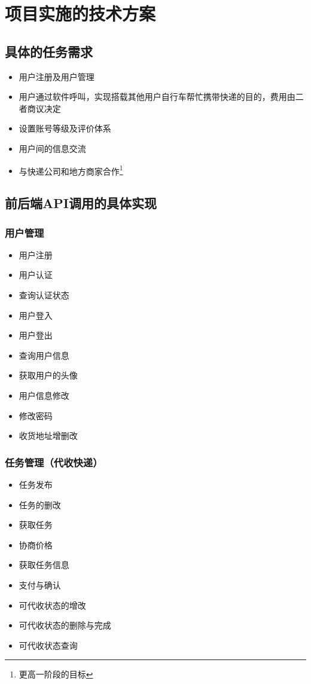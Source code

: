 \documentclass[UTF8]{dingo}
\begin{document}
  \section{项目实施的技术方案}
    \subsection{具体的任务需求}
      \begin{itemize}
        \item 用户注册及用户管理
        \item 用户通过软件呼叫，实现搭载其他用户自行车帮忙携带快递的目的，费用由二者商议决定
        \item 设置账号等级及评价体系
        \item 用户间的信息交流
        \item 与快递公司和地方商家合作\footnote{更高一阶段的目标}
      \end{itemize}
    \subsection{前后端API调用的具体实现}
      \subsubsection{用户管理}
        \begin{itemize}
          \item 用户注册
          \item 用户认证
          \item 查询认证状态
          \item 用户登入
          \item 用户登出
          \item 查询用户信息
          \item 获取用户的头像
          \item 用户信息修改
          \item 修改密码
          \item 收货地址增删改
        \end{itemize}
      \subsubsection{任务管理（代收快递）}
        \begin{itemize}
          \item 任务发布
          \item 任务的删改
          \item 获取任务
          \item 协商价格
          \item 获取任务信息
          \item 支付与确认
          \item 可代收状态的增改
          \item 可代收状态的删除与完成
          \item 可代收状态查询
        \end{itemize}
\end{document}
